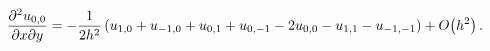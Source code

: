 \[\frac{{\partial}^{2}u_{0,0}}{\partial x\partial y}=-\frac{1}{2h^{2}}\,(u_{1,0}%
+u_{-1,0}+u_{0,1}+u_{0,-1}-2u_{0,0}-u_{1,1}-u_{-1,-1})+\mathop{O\/}\nolimits\!%
\left(h^{2}\right).\]